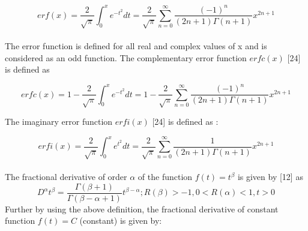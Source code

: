 \documentclass{article}
\begin{document}
\begin{equation}
    erf(x)=
    \frac{2}{\sqrt{\pi}}
    \int_0^{x}{e^{-t^2}}dt
    =\frac{2}{\sqrt{\pi}}
    \sum_{n = 0}^{\infty}
    \frac{{(-1)}^n}{(2n+1)\Gamma{(n+1)}}
    x^{2n+1}
\end{equation}
\paragraph{}
The error function is defined for all real and complex values of x and is considered as an odd function.
The complementary error function $erfc(x)$ [24] is defined as

\begin{equation}
    erfc(x)=
    1-\frac{2}{\sqrt{\pi}}
    \int_0^{x}{e^{-t^2}}dt
    =1-\frac{2}{\sqrt{\pi}}
    \sum_{n = 0}^{\infty}
    \frac{{(-1)}^n}{(2n+1)\Gamma{(n+1)}}
    x^{2n+1}
\end{equation}

The imaginary error function $erfi(x)$ [24] is defined as :

\begin{equation}
    erfi(x)=
    \frac{2}{\sqrt{\pi}}
    \int_0^{x}{e^{t^2}}dt
    =\frac{2}{\sqrt{\pi}}
    \sum_{n = 0}^{\infty}
    \frac{{1}}{(2n+1)\Gamma{(n+1)}}
    x^{2n+1}
\end{equation}
\\
The fractional derivative of order $\alpha$ of the function $f(t) = t^{\beta}$ is given by [12] as\\ 
\begin{equation}
    D^{\alpha}t^{\beta}=
    \frac{\Gamma{(\beta + 1)}}{\Gamma{(\beta - \alpha + 1)}}
    t^{\beta - \alpha};
    R(\beta) > -1, 0
    < R(\alpha) < 1, t > 0
\end{equation}
Further by using the above definition, the fractional derivative of constant function $f(t) = C$ (constant) is given by:
\end{document}
